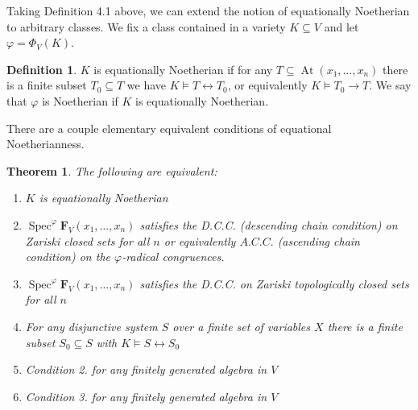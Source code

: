 \documentclass{article}
\theoremstyle{plain}
\newtheorem{theorem}{Theorem}[section]
\theoremstyle{definition}
\newtheorem{definition}{Definition}[section]
\newcommand{\Spec}{\operatorname{Spec}}
\begin{document}
Taking Definition 4.1 above, we can extend the notion of equationally Noetherian to arbitrary classes.
We fix a class contained in a variety $K \subseteq V$ and let $\varphi = \Phi_V(K)$.

\begin{definition}
    $K$ is equationally Noetherian if for any $T \subseteq \operatorname{At}(x_1, \dots, x_n)$ there is a finite subset $T_0 \subseteq T$ we have $K \models T\leftrightarrow T_0$, or equivalently $K\models T_0\rightarrow T$.
    We say that $\varphi$ is Noetherian if $K$ is equationally Noetherian.
\end{definition}

There are a couple elementary equivalent conditions of equational Noetherianness.

\begin{theorem} \label{theo:eqnoethequivcond}
    The following are equivalent:
    \begin{enumerate}
        \item $K$ is equationally Noetherian
        \item $\Spec^\varphi\mathbf{F}_V(x_1, \dots, x_n)$ satisfies the D.C.C. (descending chain condition) on Zariski closed sets for all $n$ or equivalently $A.C.C.$ (ascending chain condition) on the $\varphi$-radical congruences.
        \item $\Spec^\varphi\mathbf{F}_V(x_1, \dots, x_n)$ satisfies the D.C.C. on Zariski topologically closed sets for all $n$
        \item For any disjunctive system $S$ over a finite set of variables $X$ there is a finite subset $S_0 \subseteq S$ with $K\models S\leftrightarrow S_0$
        \item Condition 2. for any finitely generated algebra in $V$
        \item Condition 3. for any finitely generated algebra in $V$
    \end{enumerate}
\end{theorem}
\end{document}
